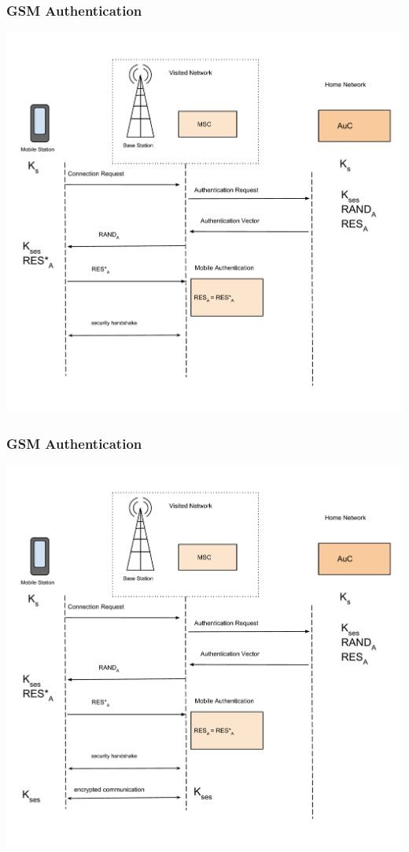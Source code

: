 \documentclass{beamer}
\begin{document}
\begin{frame}
  \frametitle{GSM Authentication}
  \begin{center}
  \includegraphics[scale =.25]{Images/GSMAuthentication4.pdf}

  \end{center} 
\end{frame}
\begin{frame}
  \frametitle{GSM Authentication}
  \begin{center}
  \includegraphics[scale =.25]{Images/GSMAuthentication5.pdf}

  \end{center} 
\end{frame}
\end{document}
